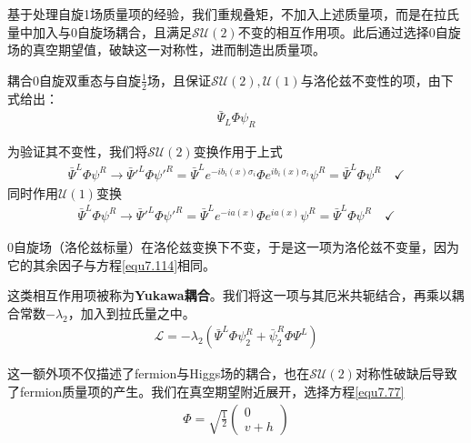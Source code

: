 基于处理自旋1场质量项的经验，我们重规叠矩，不加入上述质量项，而是在拉氏量中加入与0自旋场耦合，且满足$\mathcal{SU}(2)$不变的相互作用项。此后通过选择0自旋场的真空期望值，破缺这一对称性，进而制造出质量项。

耦合0自旋双重态与自旋$\frac{1}{2}$场，且保证$\mathcal{SU}(2),\mathcal{U}(1)$与洛伦兹不变性的项，由下式给出：
\begin{align}
\bar{\Psi}_L\Phi\psi_R
\label{7.116}
\end{align}

为验证其不变性，我们将$\mathcal{SU}(2)$变换作用于上式
\begin{align*}
\bar{\Psi}^L\Phi\psi^R\rightarrow\bar{\Psi}'^{L}\Phi\psi'^R=\bar{\Psi}^Le^{-ib_i(x)\sigma_i}\Phi e^{ib_i(x)\sigma_i}\psi^R=\bar{\Psi}^L\Phi\psi^R\quad\checkmark
\end{align*}
同时作用$\mathcal{U}(1)$变换
\begin{align*}
\bar{\Psi}^L\Phi\psi^R\rightarrow\bar{\Psi}'^{L}\Phi\psi'^R=\bar{\Psi}^Le^{-ia(x)}\Phi e^{ia(x)}\psi^R=\bar{\Psi}^L\Phi\psi^R\quad\checkmark
\end{align*}

0自旋场（洛伦兹标量）在洛伦兹变换下不变，于是这一项为洛伦兹不变量，因为它的其余因子与方程\eqref{equ7.114}相同。

这类相互作用项被称为{\bfseries Yukawa耦合}。我们将这一项与其厄米共轭结合，再乘以耦合常数$-\lambda_2$，加入到拉氏量之中。
\begin{align}
\mathscr{L}=-\lambda_2(\bar{\Psi}^L\Phi\psi_2^R+\bar{\psi}^R_2\Phi\Psi^L)
\label{7.117}
\end{align}

这一额外项不仅描述了fermion与Higgs场的耦合，也在$\mathcal{SU}(2)$对称性破缺后导致了fermion质量项的产生。我们在真空期望附近展开，选择方程\eqref{equ7.77}
\begin{align*}
\Phi=\sqrt{\frac{1}{2}}\begin{pmatrix}0 \\ v+h\end{pmatrix}
\end{align*}

